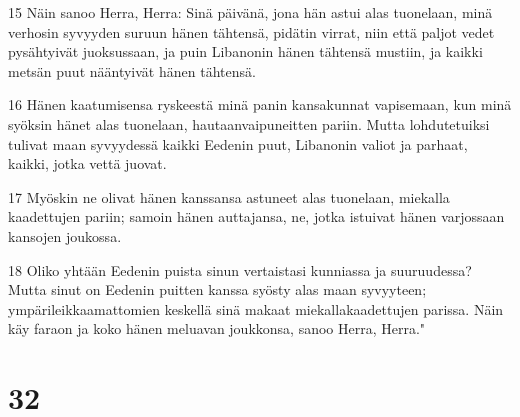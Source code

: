 \par 15 Näin sanoo Herra, Herra: Sinä päivänä, jona hän astui alas tuonelaan, minä verhosin syvyyden suruun hänen tähtensä, pidätin virrat, niin että paljot vedet pysähtyivät juoksussaan, ja puin Libanonin hänen tähtensä mustiin, ja kaikki metsän puut nääntyivät hänen tähtensä.
\par 16 Hänen kaatumisensa ryskeestä minä panin kansakunnat vapisemaan, kun minä syöksin hänet alas tuonelaan, hautaanvaipuneitten pariin. Mutta lohdutetuiksi tulivat maan syvyydessä kaikki Eedenin puut, Libanonin valiot ja parhaat, kaikki, jotka vettä juovat.
\par 17 Myöskin ne olivat hänen kanssansa astuneet alas tuonelaan, miekalla kaadettujen pariin; samoin hänen auttajansa, ne, jotka istuivat hänen varjossaan kansojen joukossa.
\par 18 Oliko yhtään Eedenin puista sinun vertaistasi kunniassa ja suuruudessa? Mutta sinut on Eedenin puitten kanssa syösty alas maan syvyyteen; ympärileikkaamattomien keskellä sinä makaat miekallakaadettujen parissa. Näin käy faraon ja koko hänen meluavan joukkonsa, sanoo Herra, Herra."

\chapter{32}

